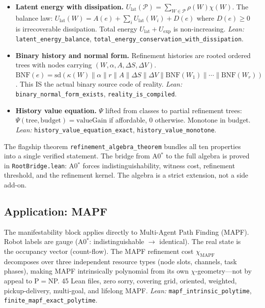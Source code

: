 \begin{itemize}
\item \textbf{Latent energy with dissipation.}
  $U_{\mathrm{lat}}(\mathcal{P}) = \sum_{W \in \mathcal{P}} \rho(W) \chi(W)$.
  The balance law: $U_{\mathrm{lat}}(W) = A(e) + \sum_i U_{\mathrm{lat}}(W_i) + D(e)$
  where $D(e) \geq 0$ is irrecoverable dissipation.
  Total energy $U_{\mathrm{lat}} + U_{\mathrm{exp}}$ is non-increasing.
  \emph{Lean:} \texttt{latent\_energy\_balance}, \texttt{total\_energy\_conservation\_with\_dissipation}.

\item \textbf{Binary history and normal form.}  Refinement histories are rooted ordered
  trees with nodes carrying $(W, \alpha, A, \Delta S, \Delta V)$.
  $\mathrm{BNF}(e) = \mathrm{sd}(\kappa(W) \| \alpha \| r \| A \| \Delta S \| \Delta V \| \mathrm{BNF}(W_1) \| \cdots \| \mathrm{BNF}(W_r))$.
  This IS the actual binary source code of reality.
  \emph{Lean:} \texttt{binary\_normal\_form\_exists}, \texttt{reality\_is\_compiled}.

\item \textbf{History value equation.}  $\Psi$ lifted from classes to partial refinement trees:
  $\Psi(\mathrm{tree}, \mathrm{budget}) = \mathrm{valueGain}$ if affordable, 0 otherwise.
  Monotone in budget.
  \emph{Lean:} \texttt{history\_value\_equation\_exact}, \texttt{history\_value\_monotone}.
\end{itemize}

\noindent
The flagship theorem \texttt{refinement\_algebra\_theorem} bundles all ten properties
into a single verified statement.
The bridge from A0$^*$ to the full algebra is proved in \texttt{RootBridge.lean}:
A0$^*$ forces indistinguishability, witness cost, refinement threshold, and the
refinement kernel.  The algebra is a strict extension, not a side add-on.

\subsection{Application: MAPF}
\label{sec:manifestability:mapf}

The manifestability block applies directly to Multi-Agent Path Finding (MAPF).
Robot labels are gauge (A0$^*$: indistinguishable $\to$ identical).
The real state is the occupancy vector (count-flow).
The MAPF refinement cost $\chi_{\mathrm{MAPF}}$ decomposes over three independent
resource types (node slots, channels, task phases), making MAPF intrinsically
polynomial from its own $\chi$-geometry---not by appeal to P$=$NP.
45 Lean files, zero sorry, covering grid, oriented, weighted, pickup-delivery,
multi-goal, and lifelong MAPF.
\emph{Lean:} \texttt{mapf\_intrinsic\_polytime}, \texttt{finite\_mapf\_exact\_polytime}.

